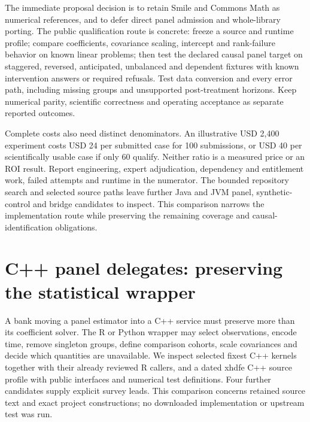 The immediate proposal decision is to retain Smile and Commons Math as
numerical references, and to defer direct panel admission and whole-library
porting. The public qualification route is concrete: freeze a source and
runtime profile; compare coefficients, covariance scaling, intercept and
rank-failure behavior on known linear problems; then test the declared causal
panel target on staggered, reversed, anticipated, unbalanced and dependent
fixtures with known intervention answers or required refusals. Test data
conversion and every error path, including missing groups and unsupported
post-treatment horizons. Keep numerical parity, scientific correctness and
operating acceptance as separate reported outcomes.
\citep{exec25_paneljava_reference}

Complete costs also need distinct denominators. An illustrative USD 2,400
experiment costs USD 24 per submitted case for 100 submissions, or USD 40
per scientifically usable case if only 60 qualify. Neither ratio is a
measured price or an ROI result. Report engineering, expert adjudication,
dependency and entitlement work, failed attempts and runtime in the numerator.
The bounded repository search and selected source paths leave further Java
and JVM panel, synthetic-control and bridge candidates to inspect. This
comparison narrows the implementation route while preserving the remaining
coverage and causal-identification obligations.~\citep{exec25_paneljava_reference}



\section{C++ panel delegates: preserving the statistical wrapper}
\label{sec:exec25-panels-cxx}
A bank moving a panel estimator into a C++ service must preserve more than
its coefficient solver. The R or Python wrapper may select observations,
encode time, remove singleton groups, define comparison cohorts, scale
covariances and decide which quantities are unavailable. We inspect selected
fixest C++ kernels together with their already reviewed R callers, and a
dated xhdfe C++ source profile with public interfaces and numerical test
definitions. Four further candidates supply explicit survey leads. This
comparison concerns retained source text and exact project constructions;
no downloaded implementation or upstream test was run.
\citep{exec25_panelcxx_fixest,exec20_fixest_source,exec25_panelcxx_xhdfe,exec25_panelcxx_reference}

